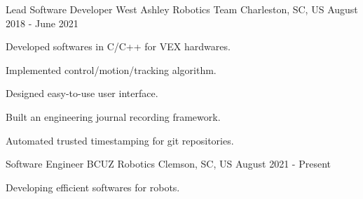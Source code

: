 

\begin{cventries}

  \cventry
    {Lead Software Developer} %
    {West Ashley Robotics Team} %
    {Charleston, SC, US} %
    {August 2018 - June 2021} %
    {
      \begin{cvitems} %
        \item {Developed softwares in C/C++ for VEX hardwares.}
        \item {Implemented control/motion/tracking algorithm.}
        \item {Designed easy-to-use user interface.}
        \item {Built an engineering journal recording framework.}
        \item {Automated trusted timestamping for git repositories.}
      \end{cvitems}
    }

  \cventry
    {Software Engineer} %
    {BCUZ Robotics} %
    {Clemson, SC, US} %
    {August 2021 - Present} %
    {
      \begin{cvitems} %
        \item {Developing efficient softwares for robots.}
      \end{cvitems}
    }

\end{cventries}
